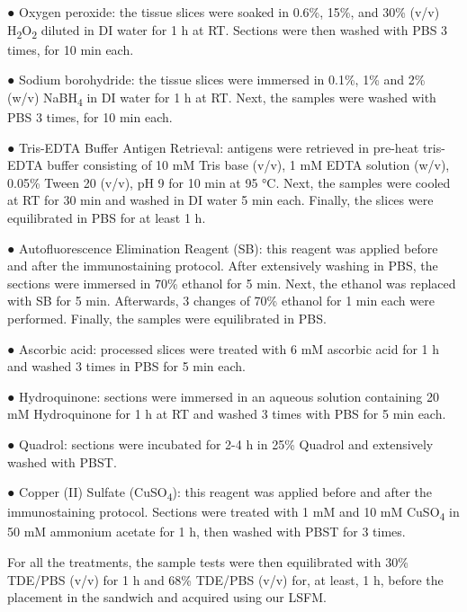 \documentclass{article}
\begin{document}
\noindent ● Oxygen peroxide: the tissue slices were soaked in 0.6\%, 15\%, and 30\% (v/v) H\textsubscript{2}O\textsubscript{2} diluted in DI water for 1 h at RT. Sections were then washed with PBS 3 times, for 10 min each.

\noindent ● Sodium borohydride: the tissue slices were immersed in 0.1\%, 1\% and 2\% (w/v) NaBH\textsubscript{4} in DI water for 1 h at RT. Next, the samples were washed with PBS 3 times, for 10 min each.

\noindent ● Tris-EDTA Buffer Antigen Retrieval: antigens were retrieved in pre-heat tris-EDTA buffer consisting of 10 mM Tris base (v/v), 1 mM EDTA solution (w/v), 0.05\% Tween 20 (v/v), pH 9 for 10 min at 95 °C. Next, the samples were cooled at RT for 30 min and washed in DI water 5 min each. Finally, the slices were equilibrated in PBS for at least 1 h.

\noindent ● Autofluorescence Elimination Reagent (SB): this reagent was applied before and after the immunostaining protocol. After extensively washing in PBS, the sections were immersed in 70\% ethanol for 5 min. Next, the ethanol was replaced with SB for 5 min. Afterwards, 3 changes of 70\% ethanol for 1 min each were performed. Finally, the samples were equilibrated in PBS.

\noindent ● Ascorbic acid: processed slices were treated with 6 mM ascorbic acid for 1 h and washed 3 times in PBS for 5 min each.

\noindent ● Hydroquinone: sections were immersed in an aqueous solution containing 20 mM Hydroquinone for 1 h at RT and washed 3 times with PBS for 5 min each.

\noindent ● Quadrol: sections were incubated for 2-4 h in 25\% Quadrol and extensively washed with PBST.

\noindent ● Copper (II) Sulfate (CuSO\textsubscript{4}): this reagent was applied before and after the immunostaining protocol. Sections were treated with 1 mM and 10 mM CuSO\textsubscript{4} in 50 mM ammonium acetate for 1 h, then washed with PBST for 3 times.

For all the treatments, the sample tests were then equilibrated with 30\% TDE/PBS (v/v) for 1 h and 68\% TDE/PBS (v/v) for, at least, 1 h, before the placement in the sandwich and acquired using our LSFM.
\end{document}
